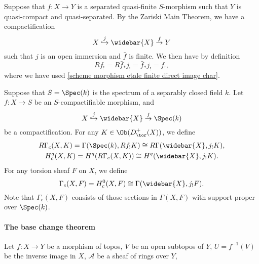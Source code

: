 \begin{example}
Suppose that $f:X\to Y$ is a separated quasi-finite $S$-morphism such that $Y$ is quasi-compact and quasi-separated. By the Zariski Main Theorem, we have a compactification
\[X\stackrel{j}{\hookrightarrow}\widebar{X}\stackrel{f}{\to}Y\]
such that $j$ is an open immersion and $\bar{f}$ is finite. We then have by definition
\[Rf_!=R\bar{f}_*j_!=\bar{f}_*j_!=f_!,\]
where we have used \cref{scheme morphism etale finite direct image char}.
\end{example}

Suppose that $S=\Spec(k)$ is the spectrum of a separably closed field $k$. Let $f:X\to S$ be an $S$-compactifiable morphism, and 
\[X\stackrel{j}{\hookrightarrow}\widebar{X}\stackrel{\bar{f}}{\to}\Spec(k)\]
be a compactification. For any $K\in\Ob(D^+_{\tor}(X))$, we define
\begin{gather*}
R\Gamma_c(X,K)=\Gamma(\Spec(k),Rf_!K)\cong R\Gamma(\widebar{X},j_!K),\\
H^q_c(X,K)=H^q(R\Gamma_c(X,K))\cong H^q(\widebar{X},j_!K).
\end{gather*} 
For any torsion sheaf $F$ on $X$, we define
\[\Gamma_c(X,F)=H^0_c(X,F)\cong\Gamma(\widebar{X},j_!F).\]
Note that $\Gamma_c(X,F)$ consists of those sections in $\Gamma(X,F)$ with support proper over $\Spec(k)$.

\paragraph{The base change theorem}
Let $f:X\to Y$ be a morphism of topos, $V$ be an open subtopos of $Y$, $U=f^{-1}(V)$ be the inverse image in $X$, $\mathscr{A}$ be a sheaf of rings over $Y$, 
\begin{theorem}

\end{theorem}


